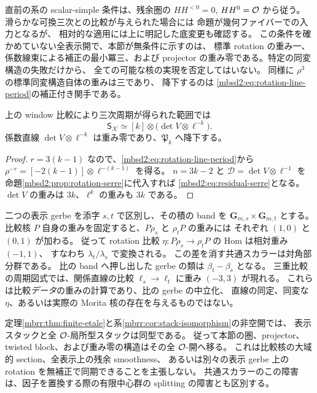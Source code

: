 \begin{remark}[条件付き非降下と標準同変構造の区別]
直前の系の scalar-simple 条件は、残余圏の $HH^{<0}=0$, $HH^0=\mathcal O$ から従う。
滑らかな可換三次との比較が与えられた場合には
命題が幾何ファイバーでの入力となるが、
相対的な適用には上に明記した底変更も確認する。
この条件を確かめていない全表示開で、本節が無条件に示すのは、
標準 rotation の重み一、係数線束による補正の最小冪三、および
projector の重み零である。特定の同変構造の失敗だけから、
全ての可能な核の実現を否定してはいない。
同様に $\rho^3$ の標準同変構造自体の重みは三であり、
降下するのは \eqref{mbsd2:eq:rotation-line-period}の補正付き関手である。
\end{remark}

\begin{corollary}
\label{mbsd2:cor:residual-serre}
上の window 比較により三次周期が得られた範囲では
\begin{equation}\label{mbsd2:eq:residual-serre}
 \mathsf S_{\mathscr K}\simeq[k]\otimes
       \bigl(\det V\otimes\ell^{-k}\bigr).
\end{equation}
係数直線 $\det V\otimes\ell^{-k}$ は重み零であり、$\mathfrak P_k$ へ降下する。
\end{corollary}
\begin{proof}
$r=3(k-1)$ なので、\eqref{mbsd2:eq:rotation-line-period}から
$\rho^{-r}=[-2(k-1)]\otimes\ell^{-(k-1)}$ を得る。
$n=3k-2$ と $\mathscr D=\det V\otimes\ell^{-1}$ を
命題\ref{mbsd2:prop:rotation-serre}に代入すれば
\eqref{mbsd2:eq:residual-serre}となる。
$\det V$ の重みは $3k$、$\ell^k$ の重みも $3k$ である。
\end{proof}

\begin{remark}[二つの表示のスカラーを同期する条件]
\label{mbsd2:rem:kernel-synchronization}
二つの表示 gerbe を添字 $s,t$ で区別し、その積の band を
$\mathbf G_{m,s}\times\mathbf G_{m,t}$ とする。
比較核 $P$ 自身の重みを固定すると、$P\rho_s$ と $\rho_tP$ の重みには
それぞれ $(1,0)$ と $(0,1)$ が加わる。
従って rotation 比較
$\eta:P\rho_s\to\rho_tP$ の Hom は相対重み $(-1,1)$、
すなわち $\lambda_t/\lambda_s$ で変換される。
この差を消す共通スカラーは対角部分群である。
比の band へ押し出した gerbe の類は $\beta_t-\beta_s$ となる。
三重比較の周期図式では、関係直線の比較
$\ell_s\to\ell_t$ に重み $(-3,3)$ が現れる。
これらは比較\emph{データ}の重みの計算であり、比の gerbe の中立化、
直線の同定、同変な $\eta$、あるいは実際の Morita 核の存在を与えるものではない。
\end{remark}

\begin{remark}[全構造対象モジュライへの適用範囲]
定理\ref{mbrr:thm:finite-etale}と系\ref{mbrr:cor:stack-isomorphism}の非空開では、
表示スタックと全 $\mathcal O$-局所型スタックは同型である。
従って本節の圏、projector、twisted block、および重み零の構造はその全 $\mathcal O$-開へ移る。
これは比較核の大域的 section、全表示上の残余 smoothness、
あるいは別々の表示 gerbe 上の rotation を無補正で同期できることを主張しない。
共通スカラーのこの障害は、因子を置換する際の有限中心群の splitting の障害とも区別する。
\end{remark}
